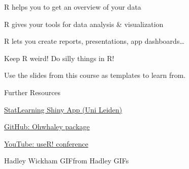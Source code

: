 \documentclass[
]{book}
\begin{document}
R helps you to get an overview of your data

R gives your tools for data analysis \& visualization

R lets you create reports, presentations, app dashboards\ldots{}

Keep R weird! Do silly things in R!

Use the slides from this course as templates to learn from.

Further Resources

\href{https://solo-fsw.shinyapps.io/NewStatLearning/}{StatLearning Shiny App (Uni Leiden)}

\href{https://github.com/fontikar/ohwhaley}{GitHub: Ohwhaley package}

\href{https://www.youtube.com/@useRConference_global}{YouTube: useR! conference}

Hadley Wickham GIFfrom Hadley GIFs

  
\end{document}
